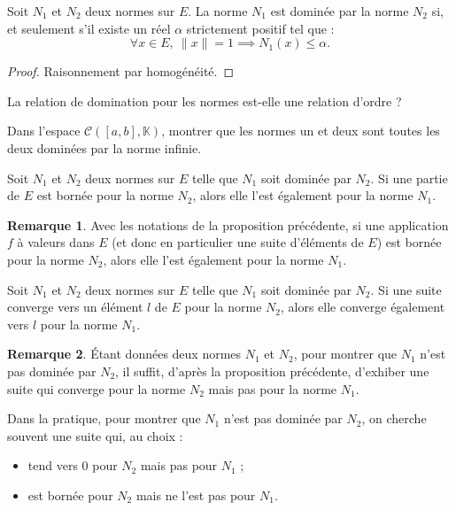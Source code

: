 \documentclass[french]{article}
\newcommand{\K}{\mathbb{K}}
\theoremstyle{plain}
\theoremstyle{definition}
\newtheorem*{rmq}{Remarque}
\theoremstyle{remark}
\begin{document}
\begin{prop}%
	Soit $N_1$ et $N_2$ deux normes sur $E$. La norme $N_1$ est dominée par la norme $N_2$ si, et seulement s'il existe un réel $\alpha$ strictement positif tel que : $$\forall x\in E,\ \lVert x\rVert=1\implies N_1(x)\leqslant\alpha.$$
\end{prop}
\begin{proof}
	Raisonnement par homogénéité.
\end{proof}

\begin{exo}
	La relation de domination pour les normes est-elle une relation d'ordre ?
\end{exo}

\begin{exo}
	Dans l'espace $\mathcal{C}([a,b],\K)$, montrer que les normes un et deux sont toutes les deux dominées par la norme infinie.
\end{exo}

\begin{prop}%
	Soit $N_1$ et $N_2$ deux normes sur $E$ telle que $N_1$ soit dominée par $N_2$. Si une partie de $E$ est bornée pour la norme $N_2$, alors elle l'est également pour la norme $N_1$.
\end{prop}

\begin{rmq}
	Avec les notations de la proposition précédente, si une application $f$ à valeurs dans $E$ (et donc en particulier une suite d'éléments de $E$) est bornée pour la norme $N_2$, alors elle l'est également pour la norme $N_1$.
\end{rmq}

\begin{prop}%
	Soit $N_1$ et $N_2$ deux normes sur $E$ telle que $N_1$ soit dominée par $N_2$. Si une suite converge vers un élément $l$ de $E$ pour la norme $N_2$, alors elle converge également vers $l$ pour la norme $N_1$.
\end{prop}

\begin{rmq}
	Étant données deux normes $N_1$ et $N_2$, pour montrer que $N_1$ n'est pas dominée par $N_2$, il suffit, d'après la proposition précédente, d'exhiber une suite qui converge pour la norme $N_2$ mais pas pour la norme $N_1$.
\end{rmq}

\begin{met}
	Dans la pratique, pour montrer que $N_1$ n'est pas dominée par $N_2$, on cherche souvent une suite qui, au choix : 
	\begin{itemize}
		\item tend vers $0$ pour $N_2$ mais pas pour $N_1$ ;
		\item est bornée pour $N_2$ mais ne l'est pas pour $N_1$.
	\end{itemize}
\end{met}
\end{document}

